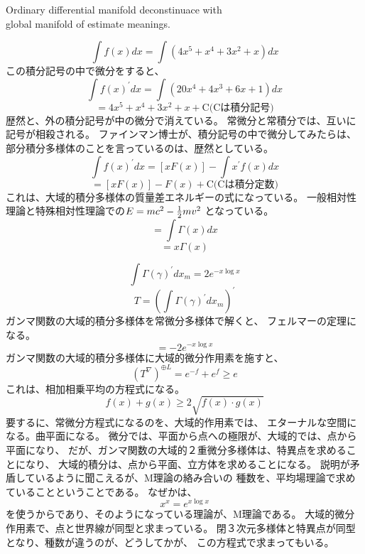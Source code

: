 \documentclass{jsarticle}
\begin{document}
\begin{center}
\Large	Ordinary differential manifold deconstinuace with \\
global manifold of estimate meanings.
\end{center}

    $$ \int f(x)dx = \int (4x^5 + x^4 + 3x^2 + x) dx$$
    この積分記号の中で微分をすると、
    $$ \int f(x)^{'} dx = \int ({20x^4 + 4x^3 + 6x +1})dx $$
    $$ = 4x^5 + x^4 + 3x^2 + x + \text{C(Cは積分記号)} $$
    歴然と、外の積分記号が中の微分で消えている。
    常微分と常積分では、互いに記号が相殺される。
    ファインマン博士が、積分記号の中で微分してみたらは、
    部分積分多様体のことを言っているのは、歴然としている。
    $$ \int f(x)^{'}dx = [xF(x)] - \int x^{'}f(x)dx $$
    $$ = [xF(x)] - F(x) + \text{C(Cは積分定数)} $$
    これは、大域的積分多様体の質量差エネルギーの式になっている。
    一般相対性理論と特殊相対性理論での$ E = mc^2 - {1 \over 2}mv^2 $
    となっている。
    $$ = \int \Gamma(x)dx $$
    $$ = x\Gamma(x) $$

    $$ \int \Gamma(\gamma)^{'}dx_m = 2e^{-x \log x} $$
    $$ T =  \left(\int \Gamma(\gamma)^{'}dx_m\right)^{'}   $$
    ガンマ関数の大域的積分多様体を常微分多様体で解くと、
    フェルマーの定理になる。
     $$ = -2 e^{-x \log x} $$
    ガンマ関数の大域的積分多様体に大域的微分作用素を施すと、
    $$ {(T^{\nabla})}^{\oplus L} = e^{-f} + e^{f} \ge e $$
    これは、相加相乗平均の方程式になる。
    $$ f(x) + g(x) \ge {2\sqrt{f(x)\cdot g(x)}} $$
    要するに、常微分方程式になるのを、大域的作用素では、
    エターナルな空間になる。曲平面になる。
    微分では、平面から点への極限が、大域的では、点から平面になり、
    だが、ガンマ関数の大域的２重微分多様体は、特異点を求めることになり、
    大域的積分は、点から平面、立方体を求めることになる。
    説明が矛盾しているように聞こえるが、M理論の絡み合いの
    種数を、平均場理論で求めていることということである。
    なぜかは、
    $$ x^x = e^{x \log x} $$
    を使うからであり、そのようになっている理論が、M理論である。
    大域的微分作用素で、点と世界線が同型と求まっている。
    閉３次元多様体と特異点が同型となり、種数が違うのが、どうしてかが、
    この方程式で求まってもいる。
\end{document}
